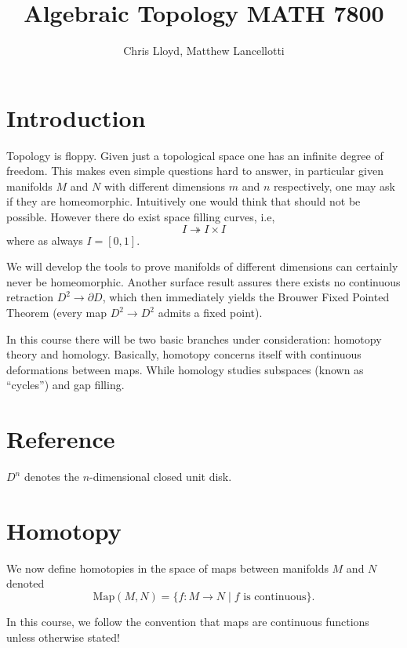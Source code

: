 \documentclass[11pt,leqno,oneside]{amsart}
\title[Algebraic Topology]{Algebraic Topology MATH 7800}
\author{Chris Lloyd, Matthew Lancellotti}
\date{}
\newenvironment{dateenv}{
  \vspace{1em}
}{
  \vspace{1em}
}
\newcommand{\mydate}[4]{
  \newdate{#1}{#2}{#3}{#4}
  \begin{dateenv}
    \hfill\displaydate{#1}
  \end{dateenv}
}
\numberwithin{thm}{section}
\renewcommand{\d}{\partial}
\newcommand{\Map}{\text{Map}}
\begin{document}
\maketitle \newpage

\mydate{d1}{18}{1}{2017}

\section{Introduction}

Topology is floppy. Given just a topological space one has an infinite
degree of freedom. This makes even simple questions hard to answer, in
particular given manifolds \(M\) and \(N\) with different dimensions
\(m\) and \(n\) respectively, one may ask if they are
homeomorphic. Intuitively one would think that should not be
possible. However there do exist space filling curves, i.e,
\[I \twoheadrightarrow I \times I\]
where as always \(I=[0,1]\).

We will develop the tools to prove manifolds of different dimensions can
certainly never be homeomorphic. Another surface result assures there exists no continuous
retraction \(D^2 \to \d D\), which then immediately yields the
Brouwer Fixed Pointed Theorem (every map \(D^2 \to D^2\) admits a
fixed point).

In this course there will be two basic branches under consideration:
homotopy theory and homology. Basically, homotopy concerns itself with
continuous deformations between maps. While homology studies subspaces
(known as ``cycles'') and gap filling.

\section{Reference}

\begin{defn}
  $D^n$ denotes the $n$-dimensional closed unit disk.
\end{defn}

\section{Homotopy}

We now define homotopies in the space of maps between manifolds \(M\)
and \(N\) denoted
\[\Map(M,N)=\{f \colon M \to N \mid \text{$f$ is continuous}\}.\]

In this course, we follow the convention that maps are continuous
functions unless otherwise stated!
\end{document}
